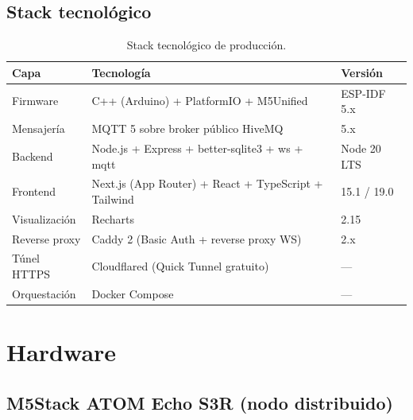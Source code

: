 \documentclass[11pt,a4paper,openany]{report}
\begin{document}
\section{Stack tecnol\'ogico}

\begin{table}[H]
\centering
{}
\begin{tabularx}{\textwidth}{l X l}
\toprule
\rowcolor{TableHead}
\textbf{Capa} & \textbf{Tecnolog\'ia} & \textbf{Versi\'on} \\ \midrule
Firmware            & C++ (Arduino) + PlatformIO + M5Unified                & ESP-IDF 5.x \\
Mensajer\'ia        & MQTT 5 sobre broker p\'ublico HiveMQ                  & 5.x \\
Backend             & Node.js + Express + better-sqlite3 + ws + mqtt        & Node 20 LTS \\
Frontend            & Next.js (App Router) + React + TypeScript + Tailwind  & 15.1 / 19.0 \\
Visualizaci\'on     & Recharts                                              & 2.15 \\
Reverse proxy       & Caddy 2 (Basic Auth + reverse proxy WS)               & 2.x \\
T\'unel HTTPS       & Cloudflared (Quick Tunnel gratuito)                   & --- \\
Orquestaci\'on      & Docker Compose                                        & --- \\ \bottomrule
\end{tabularx}
\caption{Stack tecnol\'ogico de producci\'on.}
\end{table}

\chapter{Hardware}

\section{M5Stack ATOM Echo S3R (nodo distribuido)}
\end{document}
